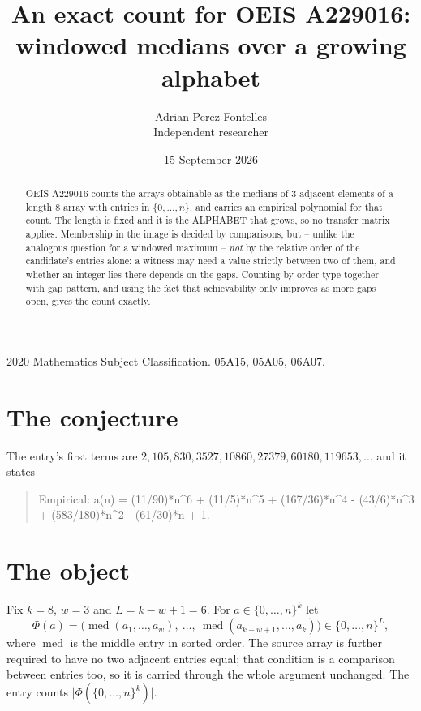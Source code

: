 \documentclass[11pt,a4paper]{article}
\title{An exact count for OEIS A229016: windowed medians over a growing alphabet}
\author{Adrian Perez Fontelles\\ \small Independent researcher}
\date{15 September 2026}
\theoremstyle{plain}
\theoremstyle{definition}
\begin{document}
\maketitle

\begin{abstract}
OEIS A229016 counts the arrays obtainable as the medians of $3$ adjacent elements of a length
$8$ array with entries in $\{0,\dots,n\}$, and carries an empirical polynomial for that
count. The length is fixed and it is the ALPHABET that grows, so no transfer matrix applies.
Membership in the image is decided by comparisons, but -- unlike the analogous question for a
windowed maximum -- \emph{not} by the relative order of the candidate's entries alone: a
witness may need a value strictly between two of them, and whether an integer lies there depends
on the gaps. Counting by order type together with gap pattern, and using the fact that
achievability only improves as more gaps open, gives the count exactly.
\end{abstract}

\noindent\small 2020 Mathematics Subject Classification. 05A15, 05A05, 06A07.\normalsize

\section{The conjecture}

The entry's first terms are $2, 105, 830, 3527, 10860, 27379, 60180, 119653,\dots$ and it states

\begin{quote}\raggedright Empirical: a(n) = (11/90)*n\^{}6 + (11/5)*n\^{}5 + (167/36)*n\^{}4 - (43/6)*n\^{}3 + (583/180)*n\^{}2 - (61/30)*n + 1.\end{quote}

\section{The object}

Fix $k=8$, $w=3$ and $L=k-w+1=6$. For $a\in\{0,\dots,n\}^k$ let
\[
  \Phi(a)=\bigl(\operatorname{med}(a_1,\dots,a_w),\ \dots,\
  \operatorname{med}(a_{k-w+1},\dots,a_k)\bigr)\in\{0,\dots,n\}^{L} ,
\]
where $\operatorname{med}$ is the middle entry in sorted order. The source array is further required to have no two adjacent entries equal; that condition is a comparison between entries too, so it is carried through the whole argument unchanged. The entry counts
$\lvert\Phi(\{0,\dots,n\}^k)\rvert$.
\end{document}

